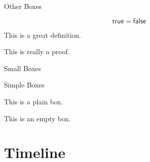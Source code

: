 \documentclass{beamer}
\begin{document}
\begin{frame}{Other Boxes}
    \begin{theorembox}
        \[\mathsf{true} = \mathsf{false}\]
    \end{theorembox}

    \begin{definitionbox}
        This is a great definition.
    \end{definitionbox}

    \begin{proofbox}
        This is really a proof.
    \end{proofbox}
\end{frame}

\begin{frame}{Small Boxes}
\end{frame}

\begin{frame}{Simple Boxes}
    \begin{plainbox}
        This is a plain box.
    \end{plainbox}

    \begin{emptybox}
        This is an empty box.
    \end{emptybox}
\end{frame}

\section{Timeline}
\subsection{} 
\end{document}
